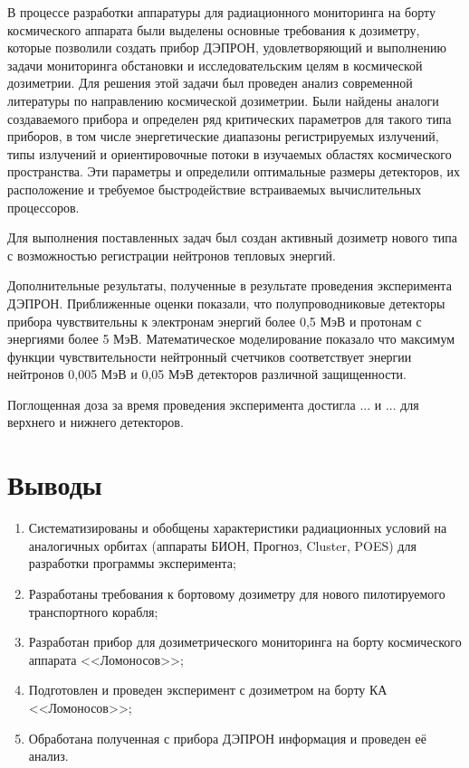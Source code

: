 
В процессе разработки аппаратуры для радиационного мониторинга на борту космического аппарата были выделены основные требования к дозиметру, которые позволили создать прибор ДЭПРОН, удовлетворяющий и выполнению задачи мониторинга обстановки и исследовательским целям в космической дозиметрии. Для решения этой задачи был проведен анализ современной литературы по направлению космической дозиметрии. Были найдены аналоги создаваемого прибора и определен ряд критических параметров для такого типа приборов, в том числе энергетические диапазоны регистрируемых излучений, типы излучений и ориентировочные потоки в изучаемых областях космического пространства. Эти параметры и определили оптимальные размеры детекторов, их расположение и требуемое быстродействие встраиваемых вычислительных процессоров.

Для выполнения поставленных задач был создан активный дозиметр нового типа с возможностью регистрации нейтронов тепловых энергий.

Дополнительные результаты, полученные в результате проведения эксперимента ДЭПРОН.  Приближенные оценки показали, что полупроводниковые детекторы прибора чувствительны к электронам энергий более 0,5 МэВ и протонам с энергиями более 5 МэВ. Математическое моделирование показало что максимум функции чувствительности нейтронный счетчиков соответствует энергии нейтронов 0,005 МэВ и 0,05 МэВ детекторов различной защищенности.

Поглощенная доза за время проведения эксперимента достигла ... и ... для верхнего и нижнего детекторов.


\section{Выводы}
\begin{enumerate}
	\item Систематизированы и обобщены характеристики радиационных условий на аналогичных орбитах (аппараты БИОН, Прогноз, Cluster, POES) для разработки программы эксперимента;
	\item Разработаны требования к бортовому дозиметру для нового пилотируемого транспортного корабля;
	\item Разработан прибор для дозиметрического мониторинга на борту космического аппарата <<Ломоносов>>;
	\item Подготовлен и проведен эксперимент с дозиметром на борту КА <<Ломоносов>>;
	\item Обработана полученная с прибора ДЭПРОН информация и проведен её анализ.	
\end{enumerate}
